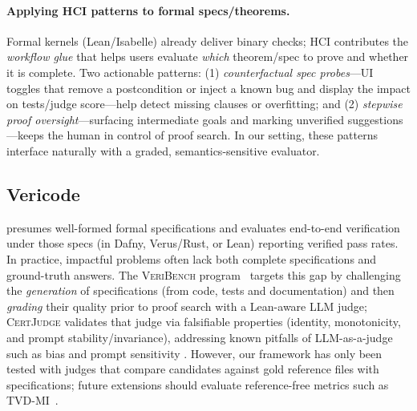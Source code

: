 \documentclass{article}
\begin{document}
\paragraph{Applying HCI patterns to formal specs/theorems.}
Formal kernels (Lean/Isabelle) already deliver binary checks; HCI contributes the \emph{workflow glue} that helps users evaluate \emph{which} theorem/spec to prove and whether it is complete. Two actionable patterns: (1) \emph{counterfactual spec probes}---UI toggles that remove a postcondition or inject a known bug and display the impact on tests/judge score---help detect missing clauses or overfitting; and (2) \emph{stepwise proof oversight}---surfacing intermediate goals and marking unverified suggestions---keeps the human in control of proof search. In our setting, these patterns interface naturally with a graded, semantics-sensitive evaluator.%


\subsection{Vericode}
\citet{bursuc2025benchmarkvericodingformallyverified} presumes well-formed formal specifications and evaluates end-to-end verification under those specs (in Dafny, Verus/Rust, or Lean) reporting verified pass rates.
In practice, impactful problems often lack both complete specifications and ground-truth answers.
The \textsc{VeriBench} program~\citep{miranda2026veribench} targets this gap by challenging the \emph{generation} of specifications (from code, tests and documentation) and then \emph{grading} their quality prior to proof search with a Lean-aware LLM judge; \textsc{CertJudge} validates that judge via falsifiable properties (identity, monotonicity, and prompt stability/invariance), addressing known pitfalls of LLM-as-a-judge such as bias and prompt sensitivity \citep{Zheng2023MTBench,Kocmi2024HumanVsLLM,Li2024TrustLLMJudgments}.
However, our framework has only been tested with judges that compare candidates against gold reference files with specifications; future extensions should evaluate reference-free metrics such as TVD-MI~\citep{robertson2025stepbystep}.
\end{document}
